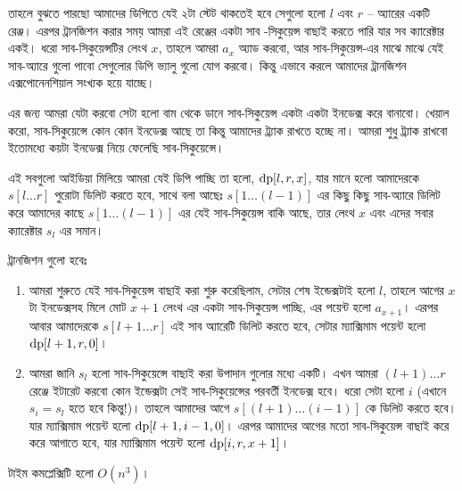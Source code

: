 \begin{solution}
  তাহলে বুঝতে পারছো আমাদের ডিপিতে যেই ২টা স্টেট থাকতেই হবে সেগুলো হলো $l$ এবং
  $r$ -- অ্যারের একটি রেঞ্জ। এরপর ট্রানজিশন করার সময় আমরা এই রেঞ্জের একটা সাব
  -সিকুয়েন্স বাছাই করতে পারি যার সব ক্যারেক্টার একই। ধরো সাব-সিকুয়েন্সটির
  লেংথ $x$, তাহলে আমরা $a_x$ অ্যাড করবো, আর সাব-সিকুয়েন্স-এর মাঝে মাঝে যেই
  সাব-অ্যারে গুলো পাবো সেগুলোর ডিপি ভ্যালু গুলো যোগ করবো। কিন্তু এভাবে করলে
  আমাদের ট্রানজিশন এক্সপোনেনশিয়াল সংখ্যক হয়ে যাচ্ছে।

  এর জন্য আমরা যেটা করবো সেটা হলো বাম থেকে ডানে সাব-সিকুয়েন্স একটা একটা
  ইনডেক্স করে বানাবো। খেয়াল করো, সাব-সিকুয়েন্সে কোন কোন ইনডেক্স আছে তা কিন্তু
  আমাদের ট্র্যাক রাখতে হচ্ছে না। আমরা শুধু ট্র্যাক রাখবো ইতোমধ্যে কয়টা
  ইনডেক্স নিয়ে ফেলেছি সাব-সিকুয়েন্সে।

  এই সবগুলো আইডিয়া মিলিয়ে আমরা যেই ডিপি পাচ্ছি তা হলো, $\text{dp}[l, r, x]$,
  যার মানে হলো আমাদেরকে $s[l \ldots r]$ পুরোটা ডিলিট করতে হবে, সাথে বলা আছেঃ
  $s[1 \ldots (l-1)]$ এর কিছু কিছু সাব-অ্যারে ডিলিট করে আমাদের কাছে $s[1
  \ldots (l-1)]$ এর যেই সাব-সিকুয়েন্স বাকি আছে, তার লেংথ $x$ এবং এদের সবার
  ক্যারেক্টার $s_l$ এর সমান।

  ট্রানজিশন গুলো হবেঃ
  \begin{enumerate}
    \item আমরা শুরুতে যেই সাব-সিকুয়েন্স বাছাই করা শুরু করেছিলাম, সেটার শেষ
    ইন্ডেক্সটাই হলো $l$, তাহলে আগের $x$ টা ইনডেক্সসহ মিলে মোট $x+1$ লেংথ এর
    একটা সাব-সিকুয়েন্স পাচ্ছি, এর পয়েন্ট হলো $a_{x+1}$। এরপর আবার আমাদেরকে
    $s[l+1 \ldots r]$ এই সাব অ্যারেটি ডিলিট করতে হবে, সেটার ম্যাক্সিমাম
    পয়েন্ট হলো $\text{dp}[l+1, r, 0]$।
    \item আমরা জানি $s_l$ হলো সাব-সিকুয়েন্সে বাছাই করা উপাদান গুলোর মধ্যে
    একটি। এখন আমরা $(l+1) \ldots r$ রেঞ্জে ইটারেট করবো কোন ইন্ডেক্সটা সেই
    সাব-সিকুয়েন্সের পরবর্তী ইনডেক্স হবে। ধরো সেটা হলো $i$ (এখানে $s_i = s_l$
    হতে হবে কিন্তু!)। তাহলে আমাদের আগে $s[(l+1) \ldots (i-1)]$ কে ডিলিট করতে
    হবে। যার ম্যাক্সিমাম পয়েন্ট হলো $\text{dp}[l+1, i-1, 0]$। এরপর আমাদের
    আগের মতো সাব-সিকুয়েন্স বাছাই করে করে আগাতে হবে, যার ম্যাক্সিমাম পয়েন্ট
    হলো $\text{dp}[i, r, x+1]$।
  \end{enumerate}

  টাইম কমপ্লেক্সিটি হলো $O(n^3)$।
\end{solution}

